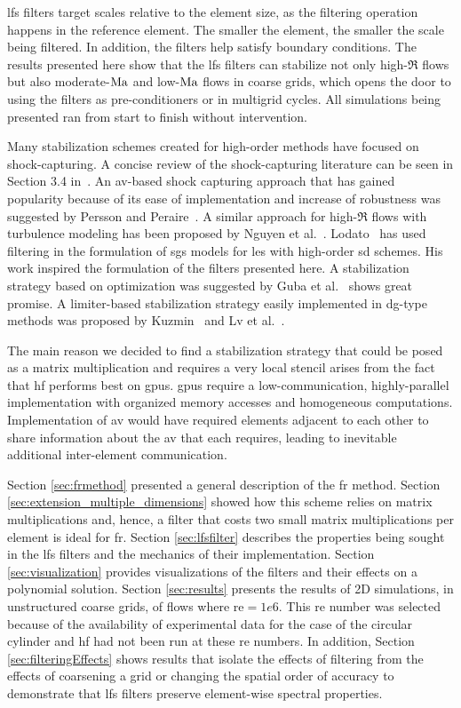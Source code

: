 \gls{lfs} filters target scales relative to the element size, as the filtering operation happens in the reference element. The smaller the element, the smaller the scale being filtered. In addition, the filters help satisfy boundary conditions. The  results presented here show that the \gls{lfs} filters can  stabilize not only high-$\Re$ flows but also moderate-$\mathrm{Ma}$ and low-$\mathrm{Ma}$ flows in coarse grids, which opens the door to using the filters as pre-conditioners or in multigrid cycles. All simulations being presented ran from start to finish without intervention.

Many stabilization schemes created for high-order methods have focused on shock-capturing. A concise review of the shock-capturing literature can be seen in Section 3.4 in~\cite{vincent2011facilitating}. An \gls{av}-based shock capturing approach that has gained popularity because of its ease of implementation and increase of robustness was suggested by Persson and Peraire~\cite{persson2006sub}. A similar approach for high-$\Re$ flows with turbulence modeling has been proposed by Nguyen et al.~\cite{nguyen2007rans}. Lodato~\cite{lodato2014structural} has used filtering in the formulation of \gls{sgs} models for \gls{les} with high-order \gls{sd} schemes. His work inspired the formulation of the filters presented here. A stabilization strategy based on optimization was suggested by Guba et al.~\cite{guba2014optimization} shows great promise. A limiter-based stabilization strategy easily implemented in \gls{dg}-type methods was proposed by Kuzmin~\cite{kuzmin2004high} and Lv et al.~\cite{lv2015entropy}.

The main reason we decided to find a stabilization strategy that could be posed as a matrix multiplication and requires a very local stencil arises from the fact that \gls{hf} performs best on \gls{gpu}s. \gls{gpu}s require a low-communication, highly-parallel implementation with organized memory accesses and homogeneous computations. Implementation of \gls{av} would have required elements adjacent to each other to share information about the \gls{av} that each requires, leading to inevitable additional inter-element communication.

 Section \ref{sec:frmethod} presented a general description of the \gls{fr} method. Section \ref{sec:extension_multiple_dimensions} showed how this scheme relies on matrix multiplications and, hence, a filter that costs two small matrix multiplications per element is ideal for \gls{fr}. Section \ref{sec:lfsfilter} describes the properties being sought in the \gls{lfs} filters and the mechanics of their implementation. Section \ref{sec:visualization} provides visualizations of the filters and their effects on a polynomial solution. Section \ref{sec:results} presents the results of 2D simulations, in unstructured coarse grids, of flows where \gls{re}$= 1e6$. This \gls{re} number was selected because of the availability of experimental data for the case of the circular cylinder and \gls{hf} had not been run at these \gls{re} numbers. In addition, Section \ref{sec:filteringEffects} shows results that isolate the effects of filtering from the effects of coarsening a grid or changing the spatial order of accuracy to demonstrate that \gls{lfs} filters preserve element-wise spectral properties.

